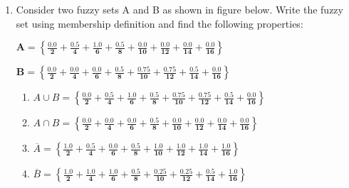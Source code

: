 \documentclass{article}
\begin{document}
\begin{enumerate}
  \item Consider two fuzzy sets A and B as shown in figure below. Write the fuzzy set using membership definition and find the following properties:

        $\boldsymbol{A =
            \left\{
            \frac{0.0}{2} +
            \frac{0.5}{4} +
            \frac{1.0}{6} +
            \frac{0.5}{8} +
            \frac{0.0}{10} +
            \frac{0.0}{12} +
            \frac{0.0}{14} +
            \frac{0.0}{16}
            \right\}}$

        $\boldsymbol{B =
            \left\{
            \frac{0.0}{2} +
            \frac{0.0}{4} +
            \frac{0.0}{6} +
            \frac{0.5}{8} +
            \frac{0.75}{10} +
            \frac{0.75}{12} +
            \frac{0.5}{14} +
            \frac{0.0}{16}
            \right\}}$

        \begin{enumerate}
          \item $A \cup B \boldsymbol{=
                    \left\{
                    \frac{0.0}{2} +
                    \frac{0.5}{4} +
                    \frac{1.0}{6} +
                    \frac{0.5}{8} +
                    \frac{0.75}{10} +
                    \frac{0.75}{12} +
                    \frac{0.5}{14} +
                    \frac{0.0}{16}
                    \right\}}$

          \item $A \cap B \boldsymbol{=
                    \left\{
                    \frac{0.0}{2} +
                    \frac{0.0}{4} +
                    \frac{0.0}{6} +
                    \frac{0.5}{8} +
                    \frac{0.0}{10} +
                    \frac{0.0}{12} +
                    \frac{0.0}{14} +
                    \frac{0.0}{16}
                    \right\}}$

          \item $\overline{A} \boldsymbol{=
                    \left\{
                    \frac{1.0}{2} +
                    \frac{0.5}{4} +
                    \frac{0.0}{6} +
                    \frac{0.5}{8} +
                    \frac{1.0}{10} +
                    \frac{1.0}{12} +
                    \frac{1.0}{14} +
                    \frac{1.0}{16}
                    \right\}}$

          \item $\overline{B} \boldsymbol{=
                    \left\{
                    \frac{1.0}{2} +
                    \frac{1.0}{4} +
                    \frac{1.0}{6} +
                    \frac{0.5}{8} +
                    \frac{0.25}{10} +
                    \frac{0.25}{12} +
                    \frac{0.5}{14} +
                    \frac{1.0}{16}
                    \right\}}$


\end{enumerate}
\end{enumerate}
\end{document}
